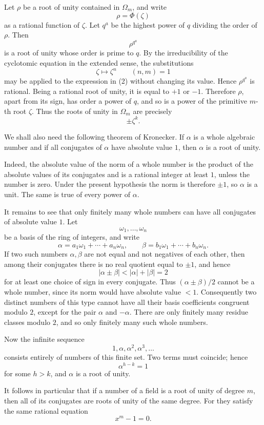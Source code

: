\documentclass[12pt,a4paper]{article}
\begin{document}
Let \(\rho\) be a root of unity contained in \(\Omega_m\), and write
\[
  \rho=\Phi(\zeta)
\tag{1}
\]
as a rational function of \(\zeta\).  Let \(q^a\) be the highest power of \(q\) dividing the order of \(\rho\).  Then
\[
  \rho^{q^a}
\tag{2}
\]
is a root of unity whose order is prime to \(q\).  By the irreducibility of the cyclotomic equation in the extended sense, the substitutions
\[
  \zeta\mapsto\zeta^n\qquad (n,m)=1
\]
may be applied to the expression in (2) without changing its value.  Hence \(\rho^{q^a}\) is rational.  Being a rational root of unity, it is equal to \(+1\) or \(-1\).  Therefore \(\rho\), apart from its sign, has order a power of \(q\), and so is a power of the primitive \(m\)-th root \(\zeta\).  Thus the roots of unity in \(\Omega_m\) are precisely
\[
  \pm \zeta^k.
\tag{3}
\]

We shall also need the following theorem of Kronecker.  If \(\alpha\) is a whole algebraic number and if all conjugates of \(\alpha\) have absolute value \(1\), then \(\alpha\) is a root of unity.

Indeed, the absolute value of the norm of a whole number is the product of the absolute values of its conjugates and is a rational integer at least \(1\), unless the number is zero.  Under the present hypothesis the norm is therefore \(\pm1\), so \(\alpha\) is a unit.  The same is true of every power of \(\alpha\).

It remains to see that only finitely many whole numbers can have all conjugates of absolute value \(1\).  Let
\[
  \omega_1,\ldots,\omega_n
\]
be a basis of the ring of integers, and write
\[
  \alpha=a_1\omega_1+\cdots+a_n\omega_n,\qquad
  \beta=b_1\omega_1+\cdots+b_n\omega_n.
\]
If two such numbers \(\alpha,\beta\) are not equal and not negatives of each other, then among their conjugates there is no real quotient equal to \(\pm1\), and hence
\[
  |\alpha\pm\beta|<|\alpha|+|\beta|=2
\]
for at least one choice of sign in every conjugate.  Thus \((\alpha\pm\beta)/2\) cannot be a whole number, since its norm would have absolute value \(<1\).  Consequently two distinct numbers of this type cannot have all their basis coefficients congruent modulo \(2\), except for the pair \(\alpha\) and \(-\alpha\).  There are only finitely many residue classes modulo \(2\), and so only finitely many such whole numbers.

Now the infinite sequence
\[
  1,\alpha,\alpha^2,\alpha^3,\ldots
\]
consists entirely of numbers of this finite set.  Two terms must coincide; hence
\[
  \alpha^{h-k}=1
\]
for some \(h>k\), and \(\alpha\) is a root of unity.

It follows in particular that if a number of a field is a root of unity of degree \(m\), then all of its conjugates are roots of unity of the same degree.  For they satisfy the same rational equation
\[
  x^m-1=0.
\]
\end{document}
